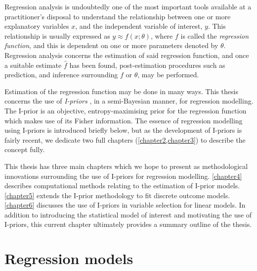 \documentclass[a4paper,showframe,11pt]{report}
\begin{document}

Regression analysis is undoubtedly one of the most important tools available at a practitioner's disposal to understand the relationship between one or more explanatory variables $x$, and the independent variable of interest, $y$.
This relationship is usually expressed as $y \approx f(x;\theta)$, where $f$ is called the \emph{regression function}, and this is   dependent on one or more parameters denoted by $\theta$.
Regression analysis concerns the estimation of said regression function, and once a suitable estimate $\hat f$ has been found, post-estimation procedures such as prediction, and inference surrounding $f$ or $\theta$, may be performed.

Estimation of the regression function may be done in many ways.
This thesis concerns the use of \emph{I-priors} \citep{bergsma2017}, in a semi-Bayesian manner, for regression modelling.
The I-prior is an objective, entropy-maximising prior for the regression function which makes use of its Fisher information.
The essence of regression modelling using I-priors is introduced briefly below, but as the development of I-priors is fairly recent, we dedicate two full chapters (\cref{chapter2,chapter3}) to describe the concept fully.

This thesis has three main chapters which we hope to present as methodological innovations surrounding the use of I-priors for regression modelling.
\cref{chapter4} describes computational methods relating to the estimation of I-prior models.
\cref{chapter5} extends the I-prior methodology to fit discrete outcome models.
\cref{chapter6} discusses the use of I-priors in variable selection for linear models. 
In addition to introducing the statistical model of interest and  motivating the use of I-priors, this current chapter ultimately provides a summary outline of the thesis.

\section{Regression models}
\label{sec:introregmod}
\end{document}
